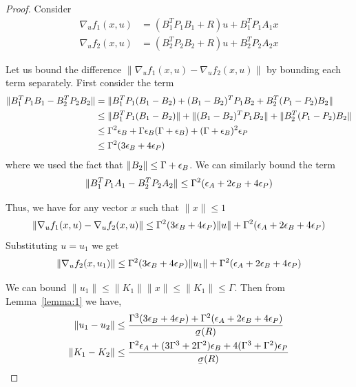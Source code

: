 \begin{proof}
  Consider
  \begin{align*}
    \nabla_{u} f_{1}(x, u) &= (B_{1}^{T}P_{1}B_{1} + R)u + B_{1}^{T}P_{1}A_{1}x \\
    \nabla_{u} f_{2}(x, u) &= (B_{2}^{T}P_{2}B_{2} + R)u + B_{2}^{T}P_{2}A_{2}x
  \end{align*}

  Let us bound the difference $\|\nabla_{u} f_{1}(x,u) - \nabla_{u} f_{2}(x, u)\|$
  by bounding each term separately. First consider the term
  \begin{align*}
    \|B_{1}^{T}P_{1}B_{1} - B_{2}^{T}P_{2}B_{2}\| &= \|B_{1}^{T}P_{1}(B_{1} - B_{2}) + (B_{1} - B_{2})^{T}P_{1}B_{2} + B_{2}^{T}(P_{1} - P_{2})B_{2}\| \\
                                                  &\leq \|B_{1}^{T}P_{1}(B_{1} - B_{2})\| + \|(B_{1} - B_{2})^{T}P_{1}B_{2}\| + \|B_{2}^{T}(P_{1} - P_{2})B_{2}\| \\
                                                  &\leq \Gamma^{2}\epsilon_B + \Gamma\epsilon_B(\Gamma + \epsilon_B) + (\Gamma + \epsilon_B)^{2}\epsilon_P \\
    &\leq \Gamma^2(3\epsilon_B + 4\epsilon_P)
  \end{align*}
  where we used the fact that $\|B_{2}\| \leq \Gamma + \epsilon_B$.
  We can similarly bound the term
  \begin{align*}
    \|B_{1}^{T}P_{1}A_{1} - B_{2}^{T}P_{2}A_{2}\| \leq
    \Gamma^{2}(\epsilon_A + 2\epsilon_B + 4\epsilon_P)
  \end{align*}


  Thus, we have for any vector $x$ such that $\|x\| \leq 1$
  \begin{align*}
    \|\nabla_{u} f_{1}(x,u) - \nabla_{u} f_{2}(x, u)\| \leq
    \Gamma^2(3\epsilon_B + 4\epsilon_P)\|u\| + \Gamma^2(\epsilon_A + 2\epsilon_B + 4\epsilon_P)
  \end{align*}
  Substituting $u=u_{1}$ we get
  \begin{align*}
    \|\nabla_{u} f_{2}(x, u_{1})\| \leq \Gamma^2(3\epsilon_B + 4\epsilon_P)\|u_1\| + \Gamma^2(\epsilon_A + 2\epsilon_B + 4\epsilon_P)
  \end{align*}

  We can bound $\|u_{1}\| \leq \|K_{1}\|\|x\| \leq \|K_{1}\| \leq \Gamma$. Then
  from Lemma~\ref{lemma:1} we have,
  \begin{align*}
    \|u_{1} - u_{2}\| &\leq \frac{\Gamma^3(3\epsB + 4\epsP) +
                        \Gamma^2(\epsA + 2\epsB + 4\epsP)}{\ubar{\sigma}(R)} \\
    \|K_{1} - K_{2}\| &\leq \frac{\Gamma^2\epsA + (3\Gamma^3 +
      2\Gamma^2)\epsB + 4(\Gamma^3 + \Gamma^2)\epsP}{\ubar{\sigma}(R)}
  \end{align*}
\end{proof}

